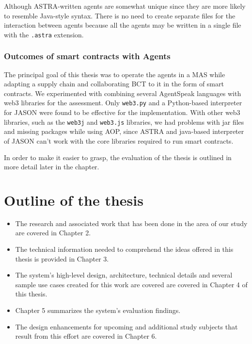  \vspace{.5cm}

  Although \ac{ASTRA}-written agents are somewhat unique since they are more likely to resemble Java-style syntax. There is no need to create separate files for the interaction between agents because all the agents may be written in a single file with the \texttt{.astra} extension.

\subsubsection{Outcomes of smart contracts with Agents}

The principal goal of this thesis was to operate the agents in a \ac{MAS} while adapting a supply chain and collaborating \ac{BCT} to it in the form of smart contracts. We experimented with combining several AgentSpeak languages with web3 libraries for the assessment. Only \texttt{web3.py} and a Python-based interpreter for JASON were found to be effective for the implementation. With other web3 libraries, such as the \texttt{web3j} and \texttt{web3.js} libraries, we had problems with jar files and missing packages while using \ac{AOP}, since \ac{ASTRA} and java-based interpreter of JASON can't work with the core libraries required to run smart contracts.

 \vspace{.5cm}
 
In order to make it easier to grasp, the evaluation of the thesis is outlined in more detail later in the chapter.
  

\section{Outline of the thesis}
\begin{itemize}
    \item The research and associated work that has been done in the area of our study are covered in Chapter 2.
    
\vspace{.5cm}

    \item The technical information needed to comprehend the ideas offered in this thesis is provided in Chapter 3.
    
\vspace{.5cm}

    \item The system's high-level design, architecture, technical details and several sample use cases created for this work are covered  are covered in Chapter 4 of this thesis.
    
\vspace{.5cm}

    \item Chapter 5 summarizes the system's evaluation findings.
    
\vspace{.5cm}

    \item The design enhancements for upcoming and additional study subjects that result from this effort are covered in Chapter 6.
\end{itemize}


